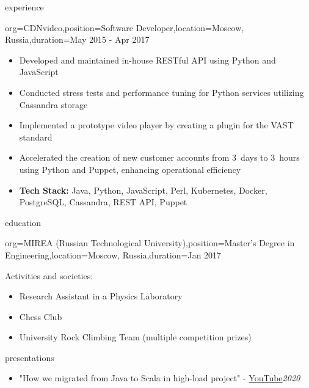 \documentclass{resume}
\begin{document}
\begin{ResumeSection}{experience}
    \begin{ResumeSubsection}{org=CDNvideo,position=Software Developer,location={Moscow, Russia},duration=May 2015 - Apr 2017}
        \begin{itemize}
            \item Developed and maintained in-house RESTful API using Python and JavaScript
            \item Conducted stress tests and performance tuning for Python services utilizing Cassandra storage
            \item Implemented a prototype video player by creating a plugin for the VAST standard
            \item Accelerated the creation of new customer accounts from 3~days to 3~hours using Python and Puppet, enhancing operational efficiency
            \item \textbf{Tech Stack:} Java, Python, JavaScript, Perl, Kubernetes, Docker, PostgreSQL, Cassandra, REST API, Puppet
        \end{itemize}
    \end{ResumeSubsection}
\end{ResumeSection}

\begin{ResumeSection}{education}
    \begin{ResumeSubsection}{org={MIREA (Russian Technological University)},position={Master's Degree in Engineering},location={Moscow, Russia},duration=Jan 2017}
        
        \medskip
        Activities and societies:
        \begin{itemize}
            \item Research Assistant in a Physics Laboratory
            \item Chess Club
            \item University Rock Climbing Team (multiple competition prizes)
        \end{itemize}
    \end{ResumeSubsection}
\end{ResumeSection}

\begin{ResumeSection}{presentations}
    \begin{itemize}
        \item "How we migrated from Java to Scala in high-load project" - \href{https://www.youtube.com/watch?v=7hEcX6lynYU}{YouTube}\hfill\em{2020}
    \end{itemize}
\end{ResumeSection}
\end{document}
